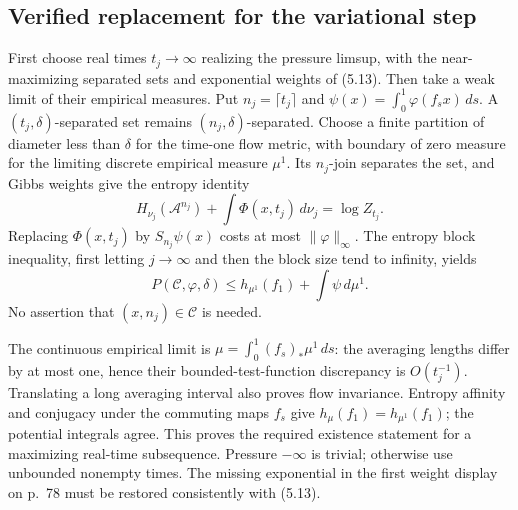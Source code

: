 \documentclass[10pt]{article}
\begin{document}
\subsection*{Verified replacement for the variational step}
First choose real times \(t_j\to\infty\) realizing the pressure limsup, with the near-maximizing separated sets and exponential weights of (5.13). Then take a weak limit of their empirical measures. Put \(n_j=\lceil t_j\rceil\) and \(\psi(x)=\int_0^1\varphi(f_sx)\,ds\). A \((t_j,\delta)\)-separated set remains \((n_j,\delta)\)-separated. Choose a finite partition of diameter less than \(\delta\) for the time-one flow metric, with boundary of zero measure for the limiting discrete empirical measure \(\mu^1\). Its \(n_j\)-join separates the set, and Gibbs weights give the entropy identity \[H_{\nu_j}(\mathcal A^{n_j})
   +\int\Phi(x,t_j)\,d\nu_j=\log Z_{t_j}.\] Replacing \(\Phi(x,t_j)\) by \(S_{n_j}\psi(x)\) costs at most \(\|\varphi\|_\infty\). The entropy block inequality, first letting \(j\to\infty\) and then the block size tend to infinity, yields \[P(\mathcal C,\varphi,\delta)
 \le h_{\mu^1}(f_1)+\int\psi\,d\mu^1.\] No assertion that \((x,n_j)\in\mathcal C\) is needed.\par
The continuous empirical limit is \(\mu=\int_0^1(f_s)_*\mu^1\,ds\): the averaging lengths differ by at most one, hence their bounded-test-function discrepancy is \(O(t_j^{-1})\). Translating a long averaging interval also proves flow invariance. Entropy affinity and conjugacy under the commuting maps \(f_s\) give \(h_\mu(f_1)=h_{\mu^1}(f_1)\); the potential integrals agree. This proves the required existence statement for a maximizing real-time subsequence. Pressure \(-\infty\) is trivial; otherwise use unbounded nonempty times. The missing exponential in the first weight display on p. 78 must be restored consistently with (5.13).\par
\end{document}

